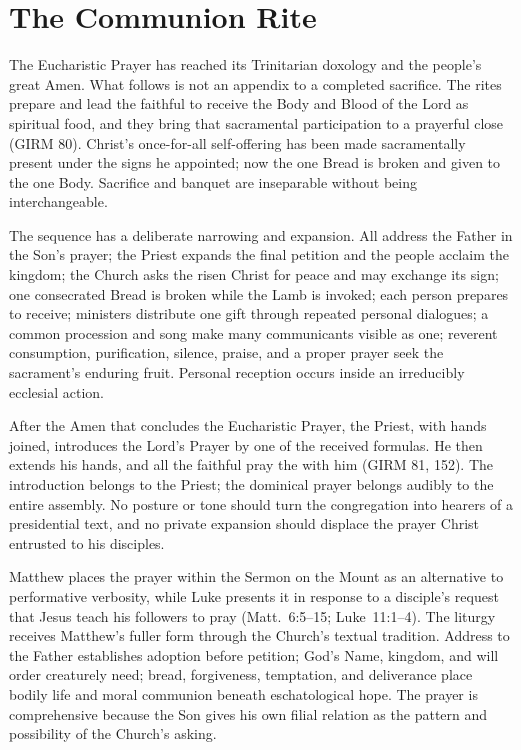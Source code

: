 \section{The Communion Rite}

The Eucharistic Prayer has reached its Trinitarian doxology and the people's great Amen. What follows is not an appendix to a completed sacrifice. The rites prepare and lead the faithful to receive the Body and Blood of the Lord as spiritual food, and they bring that sacramental participation to a prayerful close (GIRM 80). Christ's once-for-all self-offering has been made sacramentally present under the signs he appointed; now the one Bread is broken and given to the one Body. Sacrifice and banquet are inseparable without being interchangeable.

The sequence has a deliberate narrowing and expansion. All address the Father in the Son's prayer; the Priest expands the final petition and the people acclaim the kingdom; the Church asks the risen Christ for peace and may exchange its sign; one consecrated Bread is broken while the Lamb is invoked; each person prepares to receive; ministers distribute one gift through repeated personal dialogues; a common procession and song make many communicants visible as one; reverent consumption, purification, silence, praise, and a proper prayer seek the sacrament's enduring fruit. Personal reception occurs inside an irreducibly ecclesial action.


After the Amen that concludes the Eucharistic Prayer, the Priest, with hands joined, introduces the Lord's Prayer by one of the received formulas. He then extends his hands, and all the faithful pray the  with him (GIRM 81, 152). The introduction belongs to the Priest; the dominical prayer belongs audibly to the entire assembly. No posture or tone should turn the congregation into hearers of a presidential text, and no private expansion should displace the prayer Christ entrusted to his disciples.

Matthew places the prayer within the Sermon on the Mount as an alternative to performative verbosity, while Luke presents it in response to a disciple's request that Jesus teach his followers to pray (Matt.~6:5--15; Luke~11:1--4). The liturgy receives Matthew's fuller form through the Church's textual tradition. Address to the Father establishes adoption before petition; God's Name, kingdom, and will order creaturely need; bread, forgiveness, temptation, and deliverance place bodily life and moral communion beneath eschatological hope. The prayer is comprehensive because the Son gives his own filial relation as the pattern and possibility of the Church's asking.

